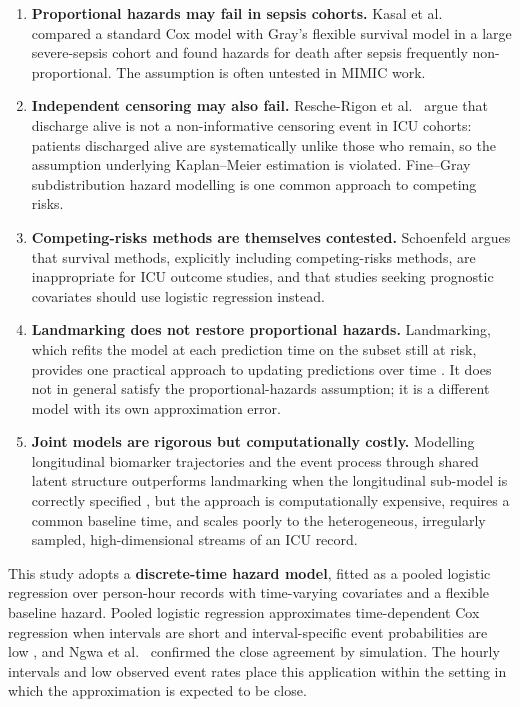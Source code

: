 \begin{enumerate}
    \item \textbf{Proportional hazards may fail in sepsis cohorts.}
    Kasal et al.\ \cite{kasal2004cox} compared a standard Cox model with
    Gray's flexible survival model in a large severe-sepsis cohort and found
    hazards for death after sepsis frequently non-proportional. The assumption
    is often untested in MIMIC work.

    \item \textbf{Independent censoring may also fail.} Resche-Rigon et al.\
    \cite{rescherigon2006competing} argue that discharge alive is not a
    non-informative censoring event in ICU cohorts: patients discharged alive
    are systematically unlike those who remain, so the assumption underlying
    Kaplan--Meier estimation is violated. Fine--Gray subdistribution hazard
    modelling \cite{finegray1999subdistribution} is one common approach to
    competing risks.

    \item \textbf{Competing-risks methods are themselves contested.} Schoenfeld
    \cite{schoenfeld2006survival} argues that survival methods, explicitly
    including competing-risks methods, are inappropriate for ICU outcome
    studies, and that studies seeking prognostic covariates should use logistic
    regression instead.

    \item \textbf{Landmarking does not restore proportional hazards.}
    Landmarking, which refits the model at each prediction time on the subset
    still at risk, provides one practical approach to updating predictions over
    time \cite{vanhouwelingen2007landmark}. It does not in general satisfy the
    proportional-hazards assumption; it is a different model with its own
    approximation error.

    \item \textbf{Joint models are rigorous but computationally costly.}
    Modelling longitudinal biomarker trajectories and the event process through
    shared latent structure outperforms landmarking when the longitudinal
    sub-model is correctly specified \cite{rizopoulos2017joint}, but the
    approach is computationally expensive, requires a common baseline time, and
    scales poorly to the heterogeneous, irregularly sampled, high-dimensional
    streams of an ICU record.
\end{enumerate}

This study adopts a \textbf{discrete-time hazard model}, fitted as a pooled
logistic regression over person-hour records with time-varying covariates and
a flexible baseline hazard. Pooled logistic regression approximates
time-dependent Cox regression when intervals are short and interval-specific
event probabilities are low \cite{dagostino1990pooled}, and Ngwa et al.\
\cite{ngwa2016comparison} confirmed the close agreement by simulation. The
hourly intervals and low observed event rates place this application within
the setting in which the approximation is expected to be close.

